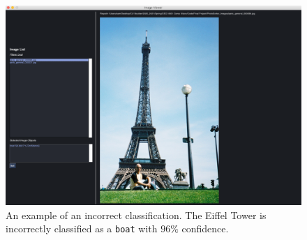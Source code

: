 \documentclass[12pt]{article}
\begin{document}
\begin{figure}[H]
	\centering
	\includegraphics[width=.9\textwidth]{images/incorrect_classification_boat.png}
	\caption{An example of an incorrect classification. The Eiffel Tower is incorrectly classified as a \texttt{boat} with $96\%$ confidence.}
	\label{fig:incorrect_classification}
\end{figure}
\end{document}
